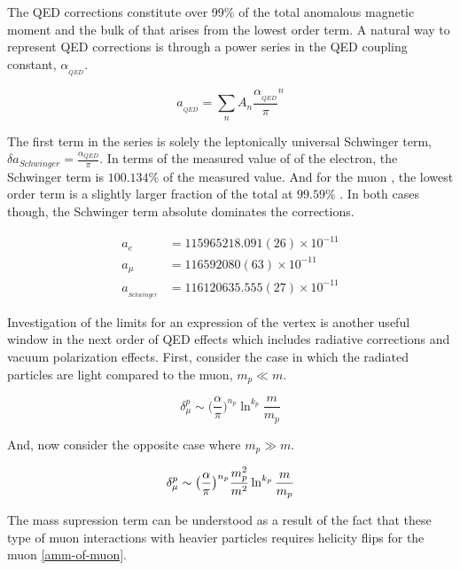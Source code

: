 The QED corrections constitute over 99\% of the total anomalous magnetic moment and the bulk of that arises from the lowest order term.  A natural way to represent QED corrections is through a power series in the QED coupling constant, $\alpha_{_{QED}}$.

\begin{equation}
\label{eqn:qed-correction-series}
a_{_{QED}} = \sum_n{A_n\frac{\alpha_{_{QED}}}{\pi}^n}
\end{equation}

\noindent
The first term in the series is solely the leptonically universal Schwinger term, $\delta a_{Schwinger} = \frac{\alpha_{QED}}{\pi}$.  In terms of the measured value of \gmtwo of the electron, the Schwinger term is $100.134\%$ of the measured value. And for the muon \gmtwo, the lowest order term is a slightly larger fraction of the total at $99.59\%$ \cite{codata}.  In both cases though, the Schwinger term absolute dominates the corrections.

\begin{align*}
a_{e}   & = 115 965 218.091(26) \times 10^{-11} \\
a_{\mu} & = 116 592 080(63) \times 10^{-11} \\
a_{_{Schwinger}} & = 116 120 635.555(27) \times 10^{-11}
\end{align*}

Investigation of the limits for an expression of the vertex is another useful window in the next order of QED effects which includes radiative corrections and vacuum polarization effects.  First, consider the case in which the radiated particles are light compared to the muon, $m_p \ll m$.

\begin{equation}
\label{eqn:qed-2nd-order-small-m}
\delta_\mu^p \sim \big(\frac{\alpha}{\pi} \big)^{n_p} \ln^{k_p}\frac{m}{m_p}
\end{equation}

\noindent
And, now consider the opposite case where $m_p \gg m$.

\begin{equation}
\label{eqn:qed-2nd-order-large-m}
\delta_\mu^p \sim \big(\frac{\alpha}{\pi} \big)^{n_p} \\
\frac{m_p^2}{m^2} \ln^{k_p}\frac{m}{m_p}
\end{equation}

\noindent
The mass supression term can be understood as a result of the fact that these type of muon interactions with heavier particles requires helicity flips for the muon \ref{amm-of-muon}.

